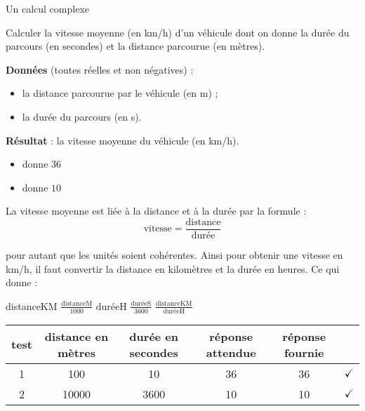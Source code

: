 \begin{Fiche}{Un calcul complexe}
\label{fiche:calcul-complexe}

	Calculer la vitesse moyenne (en km/h) d'un véhicule dont on donne
	la durée du parcours (en secondes) 
	et la distance parcourue (en mètres).

	
	\textbf{Données} (toutes réelles et non négatives) :
		\begin{itemize}
		\item la distance parcourue par le véhicule (en m) ;
		\item la durée du parcours (en s).
		\end{itemize}
		
	\textbf{Résultat} : la vitesse moyenne du véhicule (en km/h).

	\begin{center}
	\end{center}


	\begin{itemize}
	\item {} donne $36$
	\item {} donne $10$
	\end{itemize}


	La vitesse moyenne est liée à la distance et à la durée par la formule :
	\[
		\textrm{vitesse} = \frac{\textrm{distance}}{\textrm{durée}}
	\]

	pour autant que les unités soient cohérentes.
	Ainsi pour obtenir une vitesse en km/h, 
	il faut convertir la distance en kilomètres 
	et la durée en heures.
	Ce qui donne :
		
	\begin{LDA}
			\Let distanceKM \Gets $\frac{\textrm{distanceM}}{1000}$
			\Let duréeH \Gets $\frac{\textrm{duréeS}}{3600}$
			\Return $\frac{\textrm{distanceKM}}{\textrm{duréeH}}$
		\EndAlgo
	\end{LDA}


	\begin{center}
		\begin{tabular}{|c|cccc|c|}
		\hline
		test \no & distance en mètres & durée en secondes & réponse attendue & réponse fournie & {} \\\hline
		\hline 
		1 & 100   & 10   & 36 & 36 & {\color{ForestGreen}$\checkmark$} \\\hline
		2 & 10000 & 3600 & 10 & 10 & {\color{ForestGreen}$\checkmark$} \\\hline
		\end{tabular}
	\end{center}								


\end{Fiche}
